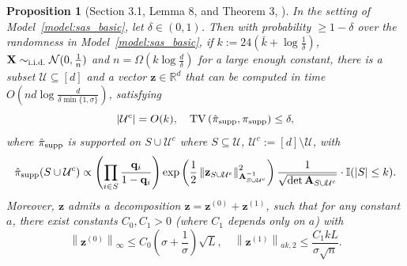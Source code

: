 \documentclass[11pt]{article}
\newtheorem{proposition}{Proposition}
\newcommand{\defeq}{:=}
\newcommand{\norm}[1]{\left\lVert#1\right\rVert}
\newcommand{\R}{\mathbb{R}}
\newcommand{\half}{\frac{1}{2}}
\newcommand{\1}{\mathbf{1}}
\newcommand{\0}{\mathbf{0}}
\newcommand{\ind}{\mathbb{I}}
\newcommand{\Par}[1]{\left(#1\right)}
\newcommand{\supp}{\mathrm{supp}}
\newcommand{\sig}{\sigma}
\newcommand{\pisupp}{\pi_{\supp}}
\newcommand{\TV}[1]{\mathrm{TV}\left(#1\right)}
\newcommand{\simiid}{\sim_{\textup{i.i.d.}}}
\newcommand{\bark}{\bar{k}}
\newcommand{\hpi}{\hat{\pi}}
\newcommand{\hpisupp}{\hpi_{\textup{supp}}}
\newcommand{\ma}{{\mathbf{A}}}
\newcommand{\mx}{{\mathbf{X}}}
\newcommand{\vq}{{\mathbf{q}}}
\newcommand{\vz}{{\mathbf{z}}}
\newcommand{\calN}{{\mathcal{N}}}
\newcommand{\calU}{{\mathcal{U}}}
\begin{document}
\begin{proposition}[Section 3.1, Lemma 8, \cite{KumarSTZ25} and Theorem 3, \cite{ChenLTZ26}]
\label{prop:approx_post_i}
In the setting of Model~\ref{model:sas_basic}, let $\delta \in (0, 1)$. Then with probability $\ge 1 - \delta$ over the randomness in Model~\ref{model:sas_basic}, if $k \defeq 24(\bark + \log \frac 1 \delta)$, $\mx\simiid \calN(0, \frac 1 n)$ and $n = \Omega(k \log \frac{d}{\delta})$ for a large enough constant, there is a subset $\calU \subseteq [d]$ and a vector $\vz \in \R^d$ that can be computed in time $O(nd\log \frac {d}{\delta\min\{1, \sig\}})$, satisfying 
\[|\calU^c| = O(k),\quad \TV{\hpisupp, \pisupp} \le \delta,\]
where $\hpisupp$ is supported on $S \cup \calU^c$ where $S \subseteq \calU$, $\calU^c \defeq [d] \setminus \calU$, with
\begin{equation}\label{eq:nudef_general}
    \hpisupp(S \cup \calU^c)
    \propto
    \Par{\prod_{i \in S} \frac{\vq_i}{1 - \vq_i}}
    \exp\Par{\half\norm{\vz_{S \cup \calU^c}}_{\ma_{S \cup \calU^c}^{-1}}^2}
    \frac 1 {\sqrt{\det \ma_{S \cup \calU^c}}}
    \cdot \ind(|S| \le k).
\end{equation}
Moreover, $\vz$ admits a decomposition $\vz = \vz^{(0)} + \vz^{(1)}$, such that for any constant $a$, there exist constants $C_0, C_1 > 0$ (where $C_1$ depends only on $a$) with
\begin{equation}\label{eq:short_flat}\norm{\vz^{(0)}}_\infty \le C_0 \Par{\sig + \frac 1 \sig} \sqrt{L},\quad \norm{\vz^{(1)}}_{ak, 2} \le  \frac{C_1 kL}{\sig \sqrt{n}}.\end{equation}
\end{proposition}
\end{document}
